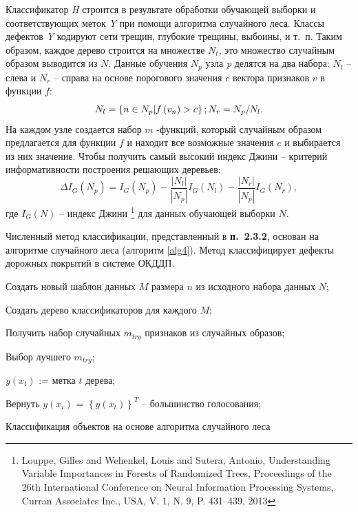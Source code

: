 Классификатор \textit{H} строится в результате обработки обучающей выборки и соответствующих меток \textit{Y} при помощи алгоритма случайного леса. Классы дефектов \textit{Y} кодируют сети трещин, глубокие трещины, выбоины, и т.~п. Таким образом, каждое дерево строится на множестве $N_t$, это множество случайным образом выводится из $N$. Данные обучения $N_p$ узла \textit{p} делятся на два набора: $N_l$ -- слева и $N_r$ -- справа на основе порогового значения $c$ вектора признаков $v$ в функции $f$:
\begin{equation}\label{eq11}
N_l = \left\{n \in N_p | f\left(v_n\right) > c\right\};  \\
N_r=N_p / N_l.
\end{equation}
На каждом узле создается набор $ m $ -функций, который случайным образом предлагается для функции $ f $ и находит все возможные значения $ c $ и выбирается из них значение. Чтобы получить самый высокий индекс Джини -- критерий информативности построения решающих деревьев:
\begin{equation}\label{eq12}
\Delta I_G\left(N_p\right)=I_G\left(N_p\right) - \frac{|N_l|}{|N_p|}I_G\left(N_l\right) - \frac{|N_r|}{|N_p|}I_G\left(N_r\right), 
\end{equation} где $I_G\left(N\right)$ -- индекс Джини \footnote {Louppe, Gilles and Wehenkel, Louis and Sutera, Antonio, Understanding Variable Importances in Forests of Randomized Trees, Proceedings of the 26th International Conference on Neural Information Processing Systems, Curran Associates Inc., USA, V. 1, N. 9, P. 431--439, 2013} для данных обучающей выборки $N$.

Численный метод классификации, представленный в \textbf{п.~2.3.2}, основан на алгоритме случайного леса (алгоритм \ref{alg4}). Метод классифицирует дефекты дорожных покрытий в системе ОКДДП.
\begin{algorithm}[ht!]
     {
		 Создать новый шаблон данных $M$ размера $n$ из исходного набора данных $N$;
		
		 Создать дерево классификаторов для каждого $M$;
		
     {
		  Получить набор случайных  $m_{try}$ признаков из случайных образов;
			
			Выбор лучшего $m_{try}$;
		}
		$y\left(x_t\right)$ := метка $t$ дерева; 
		}
		
	 Вернуть $y\left(x_i\right)$ = $\left\{y\left(x_t\right)\right\}^T$ -- большинство голосования;
		
  \caption{Классификация объектов на основе алгоритма случайного леса}\label{alg4}
	
\end{algorithm}

